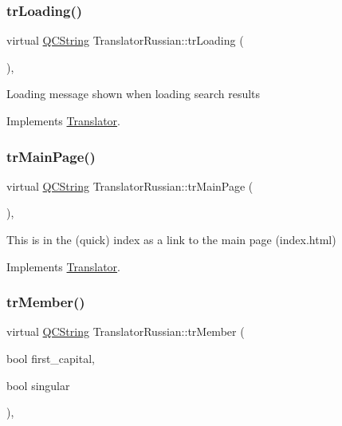 \subsubsection{\texorpdfstring{trLoading()}{trLoading()}}
{\footnotesize\ttfamily virtual \mbox{\hyperlink{class_q_c_string}{Q\+C\+String}} Translator\+Russian\+::tr\+Loading (\begin{DoxyParamCaption}{ }\end{DoxyParamCaption})\hspace{0.3cm}{\ttfamily [inline]}, {\ttfamily [virtual]}}

Loading message shown when loading search results 

Implements \mbox{\hyperlink{class_translator}{Translator}}.

\mbox{\label{class_translator_russian_a34e2c907071aac43c7d560ce8d84e75c}} 
\subsubsection{\texorpdfstring{trMainPage()}{trMainPage()}}
{\footnotesize\ttfamily virtual \mbox{\hyperlink{class_q_c_string}{Q\+C\+String}} Translator\+Russian\+::tr\+Main\+Page (\begin{DoxyParamCaption}{ }\end{DoxyParamCaption})\hspace{0.3cm}{\ttfamily [inline]}, {\ttfamily [virtual]}}

This is in the (quick) index as a link to the main page (index.\+html) 

Implements \mbox{\hyperlink{class_translator}{Translator}}.

\mbox{\label{class_translator_russian_a1297e864146794e8a356daa6d74443bb}} 
\subsubsection{\texorpdfstring{trMember()}{trMember()}}
{\footnotesize\ttfamily virtual \mbox{\hyperlink{class_q_c_string}{Q\+C\+String}} Translator\+Russian\+::tr\+Member (\begin{DoxyParamCaption}\item[{bool}]{first\+\_\+capital,  }\item[{bool}]{singular }\end{DoxyParamCaption})\hspace{0.3cm}{\ttfamily [inline]}, {\ttfamily [virtual]}}

